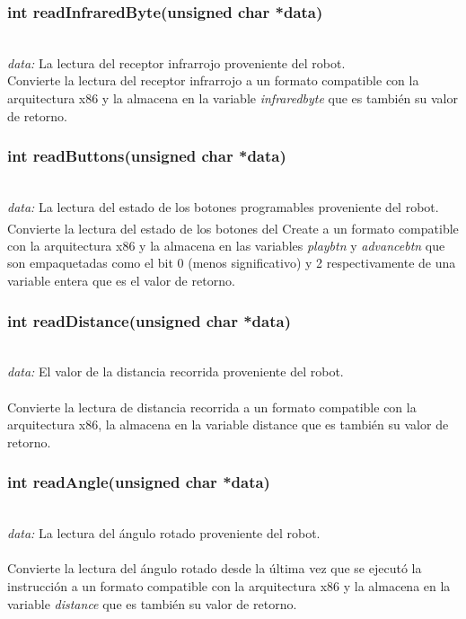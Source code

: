 \documentclass[letterpaper]{book}
\begin{document}
\subsubsection{int readInfraredByte(unsigned char *data)}\mbox{}\\
\emph{data: }La lectura del receptor infrarrojo proveniente del robot.\\
Convierte la lectura del receptor infrarrojo a un formato compatible con la arquitectura x86 y la almacena en la variable \emph{infraredbyte} que es también su valor de retorno.\\ 

\subsubsection{int readButtons(unsigned char *data)}\mbox{}\\
\emph{data: }La lectura del estado de los botones programables proveniente del robot.\\
Convierte la lectura del estado de los botones del Create\textsuperscript{\textregistered} a un formato compatible con la arquitectura x86 y la almacena en las variables \emph{playbtn} y \emph{advancebtn} que son empaquetadas como el bit 0 (menos significativo) y 2 respectivamente de una variable entera que es el valor de retorno.\\ 

\subsubsection{int readDistance(unsigned char *data)}\mbox{}\\
\emph{data: }El valor de la distancia recorrida proveniente del robot.\\\\
Convierte la lectura de distancia recorrida a un formato compatible con la arquitectura x86, la almacena en la variable distance que es también su valor de retorno.\\ 

\subsubsection{int readAngle(unsigned char *data)}\mbox{}\\
\emph{data: }La lectura del ángulo rotado proveniente del robot.\\\\
Convierte la lectura del ángulo rotado desde la última vez que se ejecutó la instrucción a un formato compatible con la arquitectura x86 y la almacena en la variable \emph{distance} que es también su valor de retorno.\\ 
\end{document}
